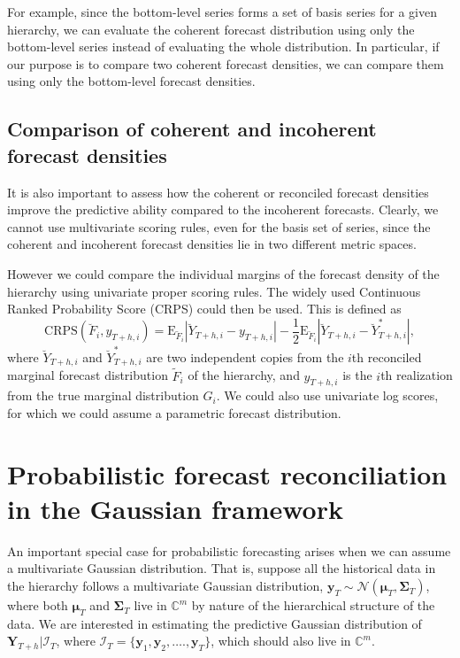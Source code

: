 \documentclass[a4paper, 11pt]{article}
\def\E{\text{E}}
\theoremstyle{theo}
\theoremstyle{definition}
\begin{document}
For example, since the bottom-level series forms a set of basis series for a given hierarchy, we can evaluate the coherent forecast distribution using only the bottom-level series instead of evaluating the whole distribution. In particular, if our purpose is to compare two coherent forecast densities, we can compare them using only the bottom-level forecast densities.

\subsection{Comparison of coherent and incoherent forecast densities}

It is also important to assess how the coherent or reconciled forecast densities improve the predictive ability compared to the incoherent forecasts. Clearly, we cannot use multivariate scoring rules, even for the basis set of series, since the coherent and incoherent forecast densities lie in two different metric spaces.

However we could compare the individual margins of the forecast density of the hierarchy using univariate proper scoring rules. The widely used Continuous Ranked Probability Score (CRPS) could then be used. This is defined as
\begin{equation} \label{eq:(3.6)}
\text{CRPS}(\breve{F}_i,y_{T+h,i}) = \E_{\breve{F}_i}|\breve{Y}_{T+h,i}-y_{T+h,i}| - \frac{1}{2}\E_{\breve{F}_i}|\breve{Y}_{T+h,i}-\breve{Y}^*_{T+h,i}|,
\end{equation}
where $\breve{Y}_{T+h,i}$ and $\breve{Y}^*_{T+h,i}$ are two independent copies from the $i$th reconciled marginal forecast distribution $\tilde{F}_i$ of the hierarchy, and $y_{T+h,i}$ is the $i$th realization from the true marginal distribution $G_i$. We could also use univariate log scores, for which we could assume a parametric forecast distribution.

\section{Probabilistic forecast reconciliation in the Gaussian framework}\label{sec:gaussian}

An important special case for probabilistic forecasting arises when we can assume a multivariate Gaussian distribution. That is, suppose all the historical data in the hierarchy follows a multivariate Gaussian distribution, $\bm{y}_T \sim \mathcal{N}(\bm{\mu}_T, \bm{\Sigma}_T)$, where both $\bm{\mu}_T$ and $\bm{\Sigma}_T$ live in $\mathbb{C}^m$ by nature of the hierarchical structure of the data. We are interested in estimating the predictive Gaussian distribution of $\bm{Y}_{T+h}| \bm{\mathcal{I}}_T$, where $\bm{\mathcal{I}}_T= \{\bm{y}_1,\bm{y}_2,\dots.,\bm{y}_T\}$, which should also live in $\mathbb{C}^m$.
\end{document}
